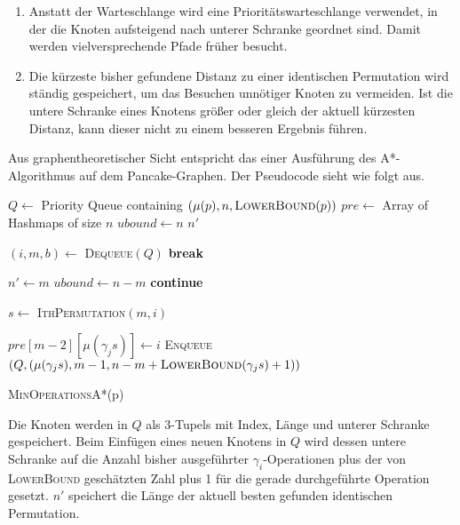 \documentclass[a4paper, 11pt, ngerman]{article}
\begin{document}
\begin{enumerate}
    \item Anstatt der Warteschlange wird eine Prioritätswarteschlange verwendet, in der die Knoten aufsteigend nach unterer Schranke geordnet sind. Damit werden vielversprechende Pfade früher besucht.
    \item Die kürzeste bisher gefundene Distanz zu einer identischen Permutation wird ständig gespeichert, um das Besuchen unnötiger Knoten zu vermeiden. Ist die untere Schranke eines Knotens größer oder gleich der aktuell kürzesten Distanz, kann dieser nicht zu einem besseren Ergebnis führen.
\end{enumerate}

Aus graphentheoretischer Sicht entspricht das einer Ausführung des A*-Algorithmus auf dem Pancake-Graphen. Der Pseudocode sieht wie folgt aus.

\begin{algorithm}

    $Q \gets$ Priority Queue containing $(\mu(p), n, \textsc{LowerBound}(p))$ \;
    $pre \gets$ Array of Hashmaps of size $n$ \;
    $ubound \gets n$ \;
    $n'$ \;

    {
        $(i, m, b) \gets$ \textsc{Dequeue}$(Q)$ \;
        {
            \textbf{break} \;
        }

        {
            {
                $n' \gets m$ \;
                $ubound \gets n - m$ \;
            }
            \textbf{continue} \;
        }

        $s \gets$ \textsc{IthPermutation}$(m, i)$ \;

        {
            {
                $pre[m - 2][\mu(\gamma_j s)] \gets i$ \;
                \textsc{Enqueue}$(Q, (\mu(\gamma_j s), m - 1, n - m + \textsc{LowerBound}(\gamma_j s) + 1))$ \;
            }
        }
    }

     \;

    \caption{\textsc{MinOperationsA*}(p)}
\end{algorithm}

Die Knoten werden in $Q$ als 3-Tupels mit Index, Länge und unterer Schranke gespeichert. Beim Einfügen eines neuen Knotens in $Q$ wird dessen untere Schranke auf die Anzahl bisher ausgeführter $\gamma_i$-Operationen plus der von \textsc{LowerBound} geschätzten Zahl plus 1 für die gerade durchgeführte Operation gesetzt. $n'$ speichert die Länge der aktuell besten gefunden identischen Permutation.
\bigskip
\end{document}
